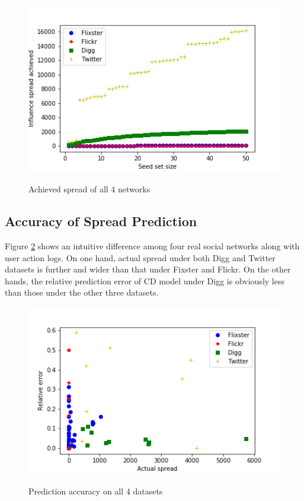 \documentclass{acm_proc_article-sp}
\begin{document}
\begin{figure}[h]
	\includegraphics[width=\linewidth]{spread4.png}
	\centering
	\label{spreadall}
    \caption{Achieved spread of all 4 networks}
\end{figure}

\subsection*{Accuracy of Spread Prediction}

Figure \ref{accuracy} shows an intuitive difference among four real social networks along with user action logs. On one hand, actual spread under both Digg and Twitter datasets is further and wider than that under Fixster and Flickr. On the other hands, the relative prediction error of CD model under Digg is obviously less than those under the other three datasets.

\begin{figure}[h]
	\includegraphics[width=\linewidth]{accuracy.png}
	\centering
	\label{accuracy}
    \caption{Prediction accuracy on all 4 datasets}
\end{figure}
\end{document}
